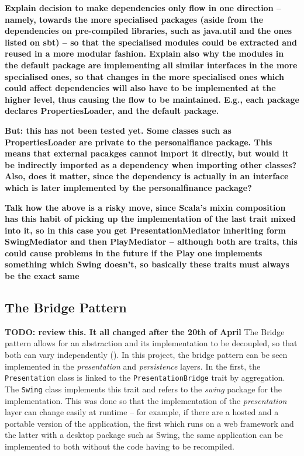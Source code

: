 \textbf{Explain decision to make dependencies only flow in one direction --
namely, towards the more specialised packages (aside from the dependencies on
pre-compiled libraries, such as java.util and the ones listed on sbt) -- so
that the specialised modules could be extracted and reused in a more modular
fashion. Explain also why the modules in the default package are implementing
all similar interfaces in the more specialised ones, so that changes in the
more specialised ones which could affect dependencies will also have to be
implemented at the higher level, thus causing the flow to be maintained. E.g.,
each package declares PropertiesLoader, and the default package.}

\textbf{But: this has not been tested yet. Some classes such as PropertiesLoader are
private to the personalfiance package. This means that external pacakges cannot
import it directly, but would it be indirectly imported as a dependency when
importing other classes? Also, does it matter, since the dependency is actually
in an interface which is later implemented by the personalfinance package?}

\textbf{Talk how the above is a risky move, since Scala's mixin composition has
this habit of picking up the implementation of the last trait mixed into it, so
in this case you get PresentationMediator inheriting form SwingMediator and
then PlayMediator -- although both are traits, this could cause problems in the
future if the Play one implements something which Swing doesn't, so basically
these traits must always be the exact same}

\subsection{The Bridge Pattern} \label{sec:Implementation.TheBridgePattern}
\textbf{TODO: review this. It all changed after the 20th of April}
The Bridge pattern allows for an abstraction and its implementation to be
decoupled, so that both can vary independently
(\cite[][Ch.~7,Location~2699]{nikolov2016scala}). In this project, the bridge
pattern can be seen implemented in the \emph{presentation} and
\emph{persistence} layers. In the first, the \texttt{Presentation} class is
linked to the \texttt{PresentationBridge} trait by aggregation. The
\texttt{Swing} class implements this trait and refers to the \emph{swing}
package for the implementation. This was done so that the implementation of the
\emph{presentation} layer can change easily at runtime -- for example, if there
are a hosted and a portable version of the application, the first which runs on
a web framework and the latter with a desktop package such as Swing, the same
application can be implemented to both without the code having to be
recompiled.

